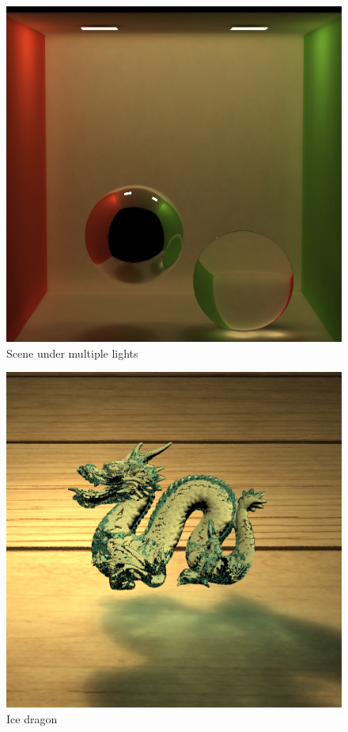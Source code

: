 \documentclass[acmtog]{acmart}
\begin{document}
	\begin{figure}[h]
		\centering
		\includegraphics[scale=0.3]{Images/multiple_lights.png}
		\caption{Scene under multiple lights}
	\end{figure}
	\begin{figure}[h]
		\centering
		\includegraphics[scale=0.3]{Images/icedragon.png}
		\caption{Ice dragon}
	\end{figure}
	
\end{document}
